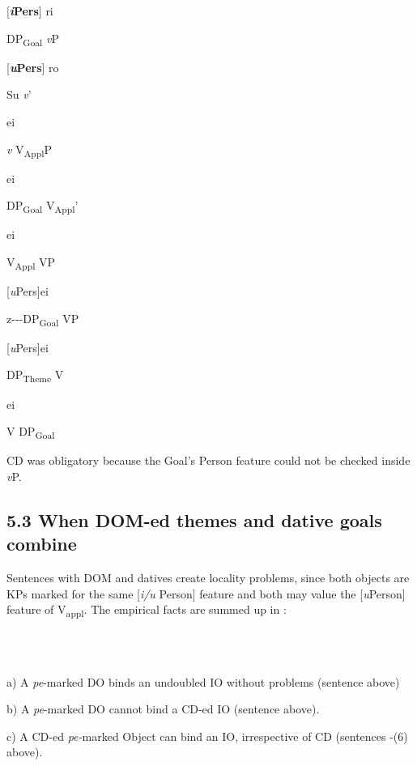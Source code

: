 \documentclass[output=paper,modfonts,nonflat]{langsci/langscibook}
\begin{document}
[\textbf{\textit{i}}\textbf{Pers}]  ri

  DP\textsubscript{Goal}    \textit{v}P

  [\textbf{\textit{u}}\textbf{Pers}]     ro

    Su    \textit{v}’

      ei

      \textit{v}    V\textsubscript{Appl}P

        ei

        DP\textsubscript{Goal}    V\textsubscript{Appl}’

          ei

          V\textsubscript{Appl}    VP

          [\textit{u}Pers]ei

          z-{}-{}-DP\textsubscript{Goal}    VP

            [\textit{u}Pers]ei

              DP\textsubscript{Theme}  V

                ei

                V  DP\textsubscript{Goal}

CD was obligatory because the Goal’s Person feature could not be checked inside \textit{v}P.

\subsection{\textbf{5.3} \textbf{When} \textbf{DOM-ed} \textbf{themes} \textbf{and} \textbf{dative} \textbf{goals} \textbf{combine}}

Sentences with DOM and datives create locality problems, since both objects are KPs marked for the same [\textit{i/u} Person] feature and both may value the [\textit{u}Person] feature of V\textsubscript{appl}. The empirical facts are summed up in :

\ea%
    \label{ex:key:37}
    \gll\\
        \\
    \glt
    \z

          

a) A \textit{pe}{}-marked DO binds an undoubled IO without problems (sentence  above) 

b) A \textit{pe}{}-marked DO cannot bind a CD-ed IO (sentence  above). 

c) A CD-ed \textit{pe-}marked Object can bind an IO, irrespective of CD (sentences -(6) above). 
\end{document}
